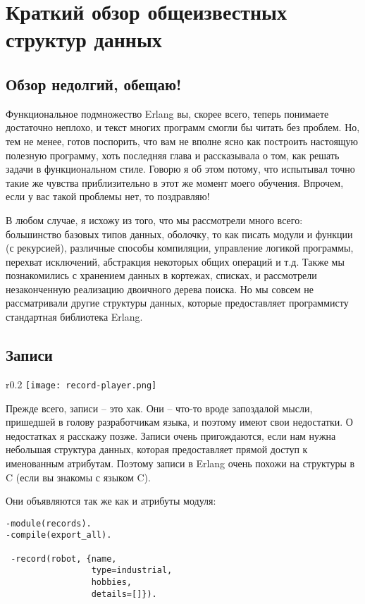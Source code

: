 \chapter{Краткий обзор общеизвестных структур данных}
\label{short-visit-to-common-data-structures}
\section{Обзор недолгий, обещаю!}
Функциональное подмножество Erlang вы, скорее всего, теперь понимаете достаточно неплохо, и текст многих программ смогли бы читать без проблем.
Но, тем не менее, готов поспорить, что вам не вполне ясно как построить настоящую полезную программу, хоть последняя глава и рассказывала о том, как решать задачи в функциональном стиле.
Говорю я об этом потому, что испытывал точно такие же чувства приблизительно в этот же момент моего обучения.
Впрочем, если у вас такой проблемы нет, то поздравляю!

В любом случае, я исхожу из того, что мы рассмотрели много всего: большинство базовых типов данных, оболочку, то как писать модули и функции (с рекурсией), различные способы компиляции, управление логикой программы, перехват исключений, абстракция некоторых общих операций и т.д.
Также мы познакомились с хранением данных в кортежах, списках, и рассмотрели незаконченную реализацию двоичного дерева поиска.
Но мы совсем не рассматривали другие структуры данных, которые предоставляет программисту стандартная библиотека Erlang.
\section{Записи}
\label{records}
\begin{wrapfigure}{r}{0.2\linewidth}
    \texttt{[image: record-player.png]}
\end{wrapfigure}
Прежде всего, записи \--- это хак.
Они \--- что\--то вроде запоздалой мысли, пришедшей в голову разработчикам языка, и поэтому имеют свои недостатки.
О недостатках я расскажу позже.
Записи очень пригождаются, если нам нужна небольшая структура данных, которая предоставляет прямой доступ к именованным атрибутам.
Поэтому записи в Erlang очень похожи на структуры в C (если вы знакомы с языком C).

Они объявляются так же как и атрибуты модуля:
\begin{lstlisting}[style=erlang]
-module(records).
-compile(export_all).
 
 -record(robot, {name,
                 type=industrial,
                 hobbies,
                 details=[]}).
\end{lstlisting}

